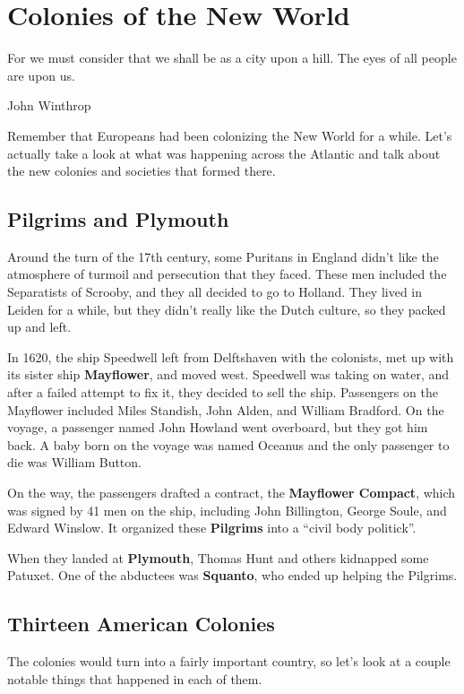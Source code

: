 \chapter{Colonies of the New World}

\epigraph{%
  For we must consider that we shall be as a city upon a hill.
  The eyes of all people are upon us.
}{John Winthrop}

Remember that Europeans had been colonizing the New World for a while.
Let's actually take a look at what was happening across the Atlantic
and talk about the new colonies and societies that formed there.

\section{Pilgrims and Plymouth}

Around the turn of the 17th century,
some Puritans in England didn't like the atmosphere of turmoil and persecution that they faced.
These men included the Separatists of Scrooby, and they all decided to go to Holland.
They lived in Leiden for a while, but they didn't really like the Dutch culture,
so they packed up and left.

In 1620, the ship Speedwell left from Delftshaven with the colonists,
met up with its sister ship \textbf{Mayflower}, and moved west.
Speedwell was taking on water, and after a failed attempt to fix it, they decided to sell the ship.
Passengers on the Mayflower included Miles Standish, John Alden, and William Bradford.
On the voyage, a passenger named John Howland went overboard, but they got him back.
A baby born on the voyage was named Oceanus and the only passenger to die was William Button.

On the way, the passengers drafted a contract, the \textbf{Mayflower Compact},
which was signed by 41 men on the ship, including John Billington, George Soule, and Edward Winslow.
It organized these \textbf{Pilgrims} into a ``civil body politick''.

When they landed at \textbf{Plymouth}, Thomas Hunt and others kidnapped some Patuxet.
One of the abductees was \textbf{Squanto}, who ended up helping the Pilgrims.

\section{Thirteen American Colonies}

The colonies would turn into a fairly important country,
so let's look at a couple notable things that happened in each of them.

